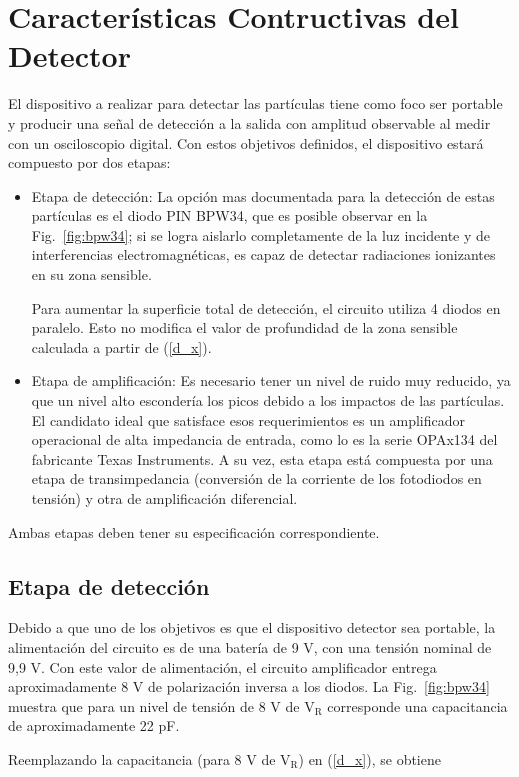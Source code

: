 \documentclass[a4paper,conference]{IEEEtran}
\begin{document}
    \section{Características Contructivas del Detector}
        El dispositivo a realizar para detectar las partículas tiene como foco
        ser portable y producir una señal de detección a la salida con amplitud
        observable al medir con un osciloscopio digital. Con estos objetivos
        definidos, el dispositivo estará compuesto por dos etapas:
        \begin{itemize}
            \item Etapa de detección: La opción mas documentada para la
                detección de estas partículas es el diodo PIN BPW34, que es
                posible observar en la Fig.~\ref{fig:bpw34}; si se logra
                aislarlo completamente de la luz incidente y de interferencias
                electromagnéticas, es capaz de detectar radiaciones ionizantes
                en su zona sensible.\par
                Para aumentar la superficie total de detección, el circuito
                utiliza 4 diodos en paralelo. Esto no modifica el valor de
                profundidad de la zona sensible calculada a partir de
                (\ref{d_x}).
            \item Etapa de amplificación: Es necesario tener un nivel de ruido
                muy reducido, ya que un nivel alto escondería los picos debido a
                los impactos de las partículas. El candidato ideal que satisface
                esos requerimientos es un amplificador operacional de alta
                impedancia de entrada, como lo es la serie OPAx134 del
                fabricante Texas Instruments. A su vez, esta etapa está
                compuesta por una etapa de transimpedancia (conversión de la
                corriente de los fotodiodos en tensión) y otra de amplificación
                diferencial.
        \end{itemize}

        Ambas etapas deben tener su especificación correspondiente.

        \subsection{Etapa de detección}
            Debido a que uno de los objetivos es que el dispositivo detector sea
            portable, la alimentación del circuito es de una batería de 9 V, con
            una tensión nominal de 9,9 V. Con este valor de alimentación, el
            circuito amplificador entrega aproximadamente 8 V de polarización
            inversa a los diodos. La Fig.~\ref{fig:bpw34}
            muestra que para un nivel de tensión de 8 V de $\mathrm{V_{R}}$
            corresponde una capacitancia de aproximadamente 22 pF.\par
            Reemplazando la capacitancia (para 8 V de $\mathrm{V_{R}}$) en
            (\ref{d_x}), se obtiene
\end{document}
